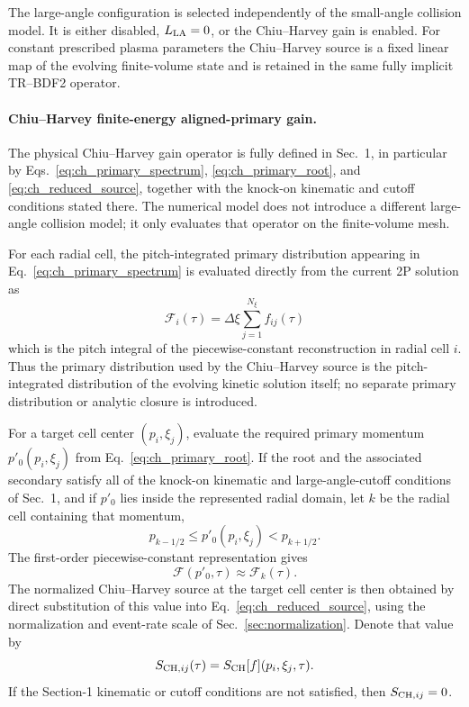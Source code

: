 \documentclass[11pt]{article}
\begin{document}
The large-angle configuration is selected independently of the small-angle collision
model.  It is either disabled, $L_{\rm LA}=0$, or the Chiu--Harvey gain is enabled.  For
constant prescribed plasma parameters the Chiu--Harvey source is a fixed linear map of
the evolving finite-volume state and is retained in the same fully implicit TR--BDF2
operator.

\paragraph{Chiu--Harvey finite-energy aligned-primary gain.}
The physical Chiu--Harvey gain operator is fully defined in
Sec.~1, in particular by Eqs.~\eqref{eq:ch_primary_spectrum},
\eqref{eq:ch_primary_root}, and \eqref{eq:ch_reduced_source}, together with the
knock-on kinematic and cutoff conditions stated there.  The numerical model does not
introduce a different large-angle collision model; it only evaluates that operator on
the finite-volume mesh.

For each radial cell, the pitch-integrated primary distribution appearing in
Eq.~\eqref{eq:ch_primary_spectrum} is evaluated directly from the current 2P
solution as
\begin{equation}
 \boxed{
 \mathcal F_i(\tau)
 =\Delta\xi\sum_{j=1}^{N_\xi} f_{ij}(\tau)
 }
 \label{eq:discrete_primary_spectrum}
\end{equation}
which is the pitch integral of the piecewise-constant reconstruction in radial cell
$i$.  Thus the primary distribution used by the Chiu--Harvey source is the
pitch-integrated distribution of the evolving kinetic solution itself; no separate
primary distribution or analytic closure is introduced.

For a target cell center $(p_i,\xi_j)$, evaluate the required primary momentum
$p'_0(p_i,\xi_j)$ from Eq.~\eqref{eq:ch_primary_root}.  If the root and the associated
secondary satisfy all of the knock-on kinematic and large-angle-cutoff conditions of
Sec.~1, and if $p'_0$ lies inside the represented radial domain, let $k$ be the radial
cell containing that momentum,
\begin{equation}
 p_{k-1/2}\le p'_0(p_i,\xi_j)<p_{k+1/2}.
 \label{eq:ch_primary_cell}
\end{equation}
The first-order piecewise-constant representation gives
\begin{equation}
 \mathcal F\!\left(p'_0,\tau\right)\approx\mathcal F_k(\tau).
 \label{eq:ch_piecewise_primary}
\end{equation}
The normalized Chiu--Harvey source at the target cell center is then obtained by direct
substitution of this value into Eq.~\eqref{eq:ch_reduced_source}, using the normalization
and event-rate scale of Sec.~\ref{sec:normalization}.  Denote that value by
\begin{equation}
 S_{{\rm CH},ij}(\tau)
 =S_{\rm CH}[f](p_i,\xi_j,\tau).
 \label{eq:ch_cell_center_source}
\end{equation}
If the Section-1 kinematic or cutoff conditions are not satisfied, then
$S_{{\rm CH},ij}=0$.
\end{document}
